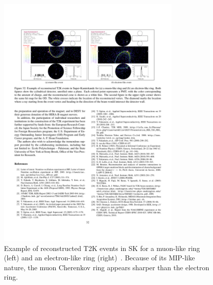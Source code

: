 \begin{figure}
  \centering
  \includegraphics[width=9cm]{images/t2k/SK_PID.pdf}
  \caption{Example of reconstructed T2K events in SK for a muon-like ring (left) and an electron-like ring (right)~\cite{Abe2011106}.  Because of its MIP-like nature, the muon Cherenkov ring appears sharper than the electron ring.}
  \label{fig:SKPID}
\end{figure}
